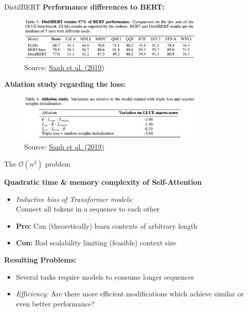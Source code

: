 \documentclass[]{beamer}
\begin{document}
\begin{frame}{DistilBERT \href{https://arxiv.org/pdf/1910.01108.pdf}{}}
\small
	\textbf{Performance differences to BERT:}

	\begin{figure}
		\centering
		\includegraphics[width = 9cm]{figure/distilbert-vs-sota.png}\\ 
		\footnotesize{Source:} \href{https://arxiv.org/pdf/1910.01108.pdf}{\footnotesize Sanh et al. (2019)}
	\end{figure}

	\textbf{Ablation study regarding the loss:}

	\begin{figure}
		\centering
		\includegraphics[width = 9cm]{figure/distilbert-ablation.png}\\ 
		\footnotesize{Source:} \href{https://arxiv.org/pdf/1910.01108.pdf}{\footnotesize Sanh et al. (2019)}
	\end{figure}
	
\end{frame}



\begin{frame}{The $\mathcal{O}(n^2)$ problem}

\textbf{Quadratic time \& memory complexity of Self-Attention}

\begin{itemize}
	\item \textit{Inductive bias of Transformer models:}\\
				Connect all tokens in a sequence to each other
	\item \textbf{Pro:} Can (theoretically) learn contexts of arbitrary length
	\item \textbf{Con:} Bad scalability limiting (feasible) context size
\end{itemize}

\vspace{.3cm}

\textbf{Resulting Problems:}

\begin{itemize}
	\item Several tasks require models to consume longer sequences
	\item \textit{Efficiency:} Are there more efficient modifications which achieve similar or even better performance? 
\end{itemize}
	
\end{frame}
\end{document}
